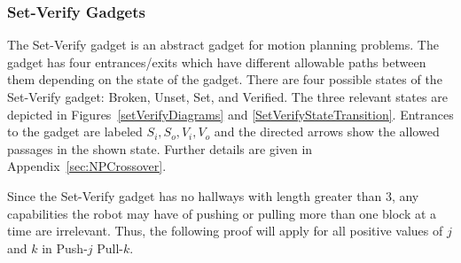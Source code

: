 \subsubsection{Set-Verify Gadgets}
\label{sec:SetVerifyGadgets}
The Set-Verify gadget is an abstract gadget for motion planning problems. The gadget has four entrances/exits which have different allowable paths between them depending on the state of the gadget. There are four possible states of the Set-Verify gadget: Broken, Unset, Set, and Verified. The three relevant states are depicted in Figures~\ref{setVerifyDiagrams} and \ref{SetVerifyStateTransition}. Entrances to the gadget are labeled $S_i, S_o, V_i, V_o$ and the directed arrows show the allowed passages in the shown state. Further details are given in Appendix~\ref{sec:NPCrossover}.
%

Since the Set-Verify gadget has no hallways with length greater than $3$, any capabilities the robot may have of pushing or pulling more than one block at a time are irrelevant. Thus, the following proof will apply for all positive values of $j$ and $k$ in Push-$j$ Pull-$k$.

